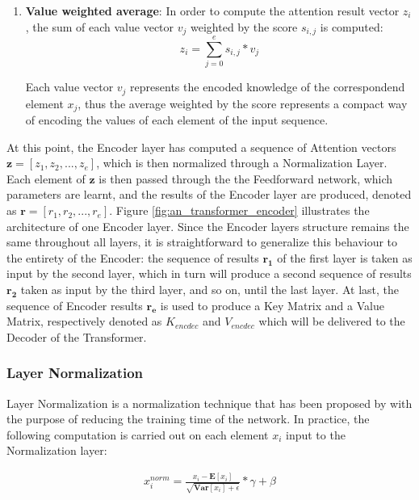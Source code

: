 \begin{enumerate}
                    \item \textbf{Value weighted average}: In order to compute the attention result vector $z_i$, the sum of each value vector $v_j$ weighted by the score $s_{i,j}$ is computed:
                    \[ z_i = \sum_{j=0}^e s_{i,j} * v_j \]
                    
                    Each value vector $v_j$ represents the encoded knowledge of the correspondend element $x_j$, thus the average weighted by the score represents a compact way of encoding the values of each element of the input sequence.
                    
                \end{enumerate}
                \noindent
                At this point, the Encoder layer has computed a sequence of Attention vectors $\mathbf{z} = [z_1, z_2, ..., z_e]$, which is then normalized through a Normalization Layer. Each element of $\mathbf{z}$ is then passed through the the Feedforward network, which parameters are learnt, and the results of the Encoder layer are produced, denoted as $\mathbf{r} = [r_1, r_2, ..., r_e]$. Figure \ref{fig:an_transformer_encoder} illustrates the architecture of one Encoder layer.\newline
                Since the Encoder layers structure remains the same throughout all layers, it is straightforward to generalize this behaviour to the entirety of the Encoder: the sequence of results $\mathbf{r_1}$ of the first layer is taken as input by the second layer, which in turn will produce a second sequence of results $\mathbf{r_2}$ taken as input by the third layer, and so on, until the last layer. \newline
                At last, the sequence of Encoder results $\mathbf{r_e}$ is used to produce a Key Matrix and a Value Matrix, respectively denoted as $K_{encdec}$ and $V_{encdec}$ which will be delivered to the Decoder of the Transformer.
            
            \subsubsection{Layer Normalization}
                Layer Normalization is a normalization technique that has been proposed by  with the purpose of reducing the training time of the network. In practice, the following computation is carried out on each element $x_{i}$ input to the Normalization layer:
                
                \begin{align}
                \label{eq:layer_norm}
                    x^{norm}_{i} = \frac{x_{i} - \mathbf{E} \left[ x_{i} \right]}{\sqrt{\mathbf{Var} \left[ x_{i} \right] + \epsilon}} * \gamma + \beta
                \end{align}
                
